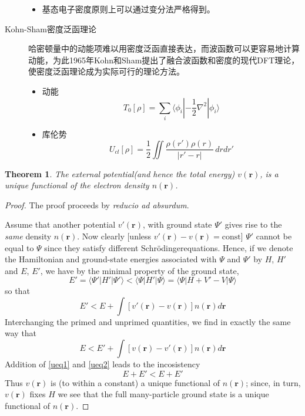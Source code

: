 \documentclass{article}
\newtheorem{theorem}{Theorem}[section]
\newtheorem{proof}{Proof}[section]
\numberwithin{equation}{section}
\newcommand{\bracketl}[3]{\langle #1 | #2 | #3 \rangle}
\newcommand{\sch}{Schr\"odinger}
\newcommand{\grad}{\nabla}
\begin{document}
\begin{description}
\begin{itemize}
		\item 基态电子密度原则上可以通过变分法严格得到。

	\end{itemize}

	\item[Kohn-Sham密度泛函理论]
	哈密顿量中的动能项难以用密度泛函直接表达，而波函数可以更容易地计算动能，为此1965年Kohn和Sham提出了融合波函数和密度的现代DFT理论，使密度泛函理论成为实际可行的理论方法。

	\begin{itemize}
		\item 动能
		\begin{equation}
		T_0[\rho]=\sum_i\bracketl{\phi_i}{-\frac{1}{2}\grad^2}{\phi_i}
		\end{equation}

		\item 库伦势
		\begin{equation}
		U_{cl}[\rho]=\frac{1}{2}\iint\frac{\rho(r')\rho(r)}{|r'-r|}\,drdr'
		\end{equation}
	\end{itemize}

\end{description}


\begin{theorem}
The external potential(and hence the total energy) $v(\textbf{r})$, is a unique functional of the electron density $n(\textbf{r})$.
\end{theorem}

\begin{proof}
The proof proceeds by \emph{reducio ad absurdum}. 

Assume that another potential $v'(\textbf{r})$, with ground state $\Psi'$ gives rise to the \emph{same} density $n(\textbf{r})$. Now clearly [unless $v'(\textbf{r})-v(\textbf{r})=\mathrm{const}$] $\Psi'$ cannot be equal to $\Psi$ since they satisfy different \sch equations. Hence, if we denote the Hamiltonian and ground-state energies associated with $\Psi$ and $\Psi'$ by $H$, $H'$ and $E$, $E'$, we have by the minimal property of the ground state,
\begin{equation}
E'=\bracketl{\Psi'}{H'}{\Psi'}<\bracketl{\Psi}{H'}{\Psi}=\bracketl{\Psi}{H+V'-V}{\Psi}
\end{equation}
so that
\begin{equation}
E'<E+\int [v'(\textbf{r})-v(\textbf{r})]n(\textbf{r})d\textbf{r}
\label{ueq1}
\end{equation}
Interchanging the primed and unprimed quantities, we find in exactly the same way that
\begin{equation}
E<E'+\int [v(\textbf{r})-v'(\textbf{r})]n(\textbf{r})d\textbf{r}
\label{ueq2}
\end{equation}
Addition of \ref{ueq1} and \ref{ueq2} leads to the incosistency
\begin{equation}
E+E'<E+E'
\end{equation}
Thus $v(\textbf{r})$ is (to within a constant) a unique functional of $n(\textbf{r})$; since, in turn, $v(\textbf{r})$ fixes $H$ we see that the full many-particle ground state is a unique functional of $n(\textbf{r})$.\cite{PhysRev.136.B864}
\end{proof}
\end{document}
